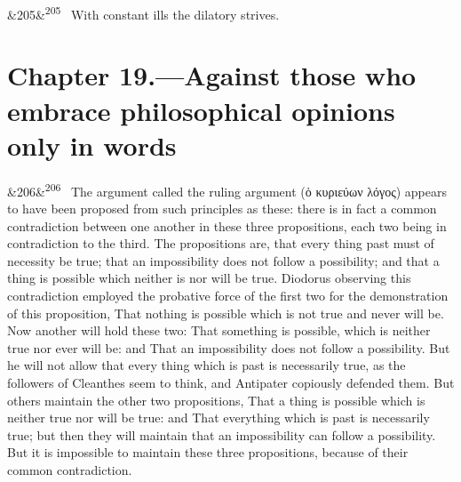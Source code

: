 \documentclass[12pt]{article}
\newcommand{\para}[1][]{\par\noindent\ifx&#1&\else\textsuperscript{\footnotesize #1}~\fi}
\begin{document}
\para[205] With constant ills the dilatory strives.

\section*{Chapter 19.---Against those who embrace philosophical opinions only in words}

\para[206] The argument called the ruling argument (ὁ κυριεύων λόγος) appears to have been proposed from such principles as these: there is in fact a common contradiction between one another in these three propositions, each two being in contradiction to the third. The propositions are, that every thing past must of necessity be true; that an impossibility does not follow a possibility; and that a thing is possible which neither is nor will be true. Diodorus observing this contradiction employed the probative force of the first two for the demonstration of this proposition, That nothing is possible which is not true and never will be. Now another will hold these two: That something is possible, which is neither true nor ever will be: and That an impossibility does not follow a possibility. But he will not allow that every thing which is past is necessarily true, as the followers of Cleanthes seem to think, and Antipater copiously defended them. But others maintain the other two propositions, That a thing is possible which is neither true nor will be true: and That everything which is past is necessarily true; but then they will maintain that an impossibility can follow a possibility. But it is impossible to maintain these three propositions, because of their common contradiction.
\end{document}

